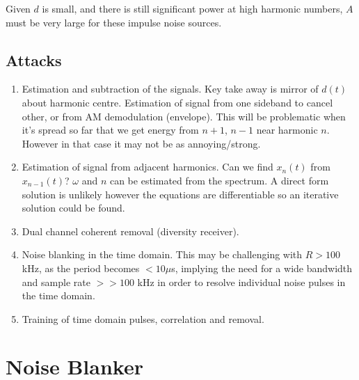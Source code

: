 \documentclass{article}
\begin{document}
Given $d$ is small, and there is still significant power at high harmonic numbers, $A$ must be very large for these impulse noise sources.

\subsection{Attacks}

\begin{enumerate}
\item Estimation and subtraction of the signals. Key take away is mirror of $d(t)$ about harmonic centre. Estimation of signal from one sideband to cancel other, or from AM demodulation (envelope). This will be problematic when it's spread so far that we get energy from $n+1$, $n-1$ near harmonic $n$.  However in that case it may not be as annoying/strong.

\item Estimation of signal from adjacent harmonics.  Can we find $x_n(t)$ from $x_{n-1}(t)$?  $\omega$ and $n$ can be estimated from the spectrum.  A direct form solution is unlikely however the equations are differentiable so an iterative solution could be found.

\item Dual channel coherent removal (diversity receiver).

\item Noise blanking in the time domain.  This may be challenging with $R>100$ kHz, as the period becomes $< 10\mu$s, implying the need for a wide bandwidth and sample rate $>>100$ kHz in order to resolve individual noise pulses in the time domain.

\item Training of time domain pulses, correlation and removal.
\end{enumerate}

\section{Noise Blanker}
\end{document}

